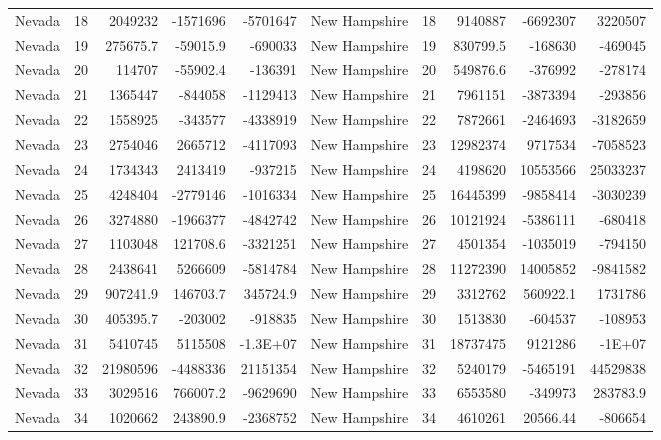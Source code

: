 \begin{table}[]
\begin{tabular}{lrrrrlrrrr}
		Nevada &  18 & 2049232 & -1571696 & -5701647 & New Hampshire &  18 & 9140887 & -6692307 & 3220507 \\
		Nevada &  19 & 275675.7 & -59015.9 & -690033 & New Hampshire &  19 & 830799.5 & -168630 & -469045 \\
		Nevada &  20 & 114707 & -55902.4 & -136391 & New Hampshire &  20 & 549876.6 & -376992 & -278174 \\
		Nevada &  21 & 1365447 & -844058 & -1129413 & New Hampshire &  21 & 7961151 & -3873394 & -293856 \\
		Nevada &  22 & 1558925 & -343577 & -4338919 & New Hampshire &  22 & 7872661 & -2464693 & -3182659 \\
		Nevada &  23 & 2754046 & 2665712 & -4117093 & New Hampshire &  23 & 12982374 & 9717534 & -7058523 \\
		Nevada &  24 & 1734343 & 2413419 & -937215 & New Hampshire &  24 & 4198620 & 10553566 & 25033237 \\
		Nevada &  25 & 4248404 & -2779146 & -1016334 & New Hampshire &  25 & 16445399 & -9858414 & -3030239 \\
		Nevada &  26 & 3274880 & -1966377 & -4842742 & New Hampshire &  26 & 10121924 & -5386111 & -680418 \\
		Nevada &  27 & 1103048 & 121708.6 & -3321251 & New Hampshire &  27 & 4501354 & -1035019 & -794150 \\
		Nevada &  28 & 2438641 & 5266609 & -5814784 & New Hampshire &  28 & 11272390 & 14005852 & -9841582 \\
		Nevada &  29 & 907241.9 & 146703.7 & 345724.9 & New Hampshire &  29 & 3312762 & 560922.1 & 1731786 \\
		Nevada &  30 & 405395.7 & -203002 & -918835 & New Hampshire &  30 & 1513830 & -604537 & -108953 \\
		Nevada &  31 & 5410745 & 5115508 & -1.3E+07 & New Hampshire &  31 & 18737475 & 9121286 & -1E+07 \\
		Nevada &  32 & 21980596 & -4488336 & 21151354 & New Hampshire &  32 & 5240179 & -5465191 & 44529838 \\
		Nevada &  33 & 3029516 & 766007.2 & -9629690 & New Hampshire &  33 & 6553580 & -349973 & 283783.9 \\
		Nevada &  34 & 1020662 & 243890.9 & -2368752 & New Hampshire &  34 & 4610261 & 20566.44 & -806654
	\end{tabular}
\end{table}

